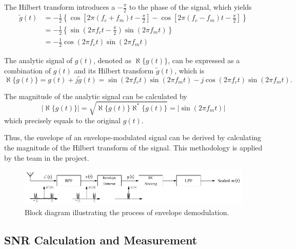 \documentclass[../ECE459FinalProjectReport.tex]{subfiles}
\begin{document}
The Hilbert transform introduces a $-\frac{\pi}{2}$ to the phase of the signal, which yields
\begin{equation}
    \begin{aligned}
        \tilde{g}(t)&=-\frac{1}{2}\left\lbrace\cos\left[2\pi (f_c+f_m)t - \frac{\pi}{2}\right]-\cos\left[2\pi (f_c-f_m)t - \frac{\pi}{2}\right]\right\rbrace\\
        &=-\frac{1}{2}\left\{ \sin \left( 2\pi f_ct-\frac{\pi}{2} \right) \sin \left( 2\pi f_mt \right) \right\} \\
                    &=-\frac{1}{2}\cos \left( 2\pi f_ct \right) \sin \left( 2\pi f_mt \right) 
    \end{aligned}
\end{equation}

The analytic signal of $g(t)$, denoted as $\aleph\{g(t)\}$, can be expressed as a combination of $g(t)$ and its Hilbert transform $\tilde{g}(t)$, which is
\begin{equation}
    \aleph\{g(t)\} = g(t) + j\tilde{g}(t) = \sin(2\pi f_c t)\sin(2\pi f_m t) - j\cos(2\pi f_c t)\sin(2\pi f_m t).
\end{equation}

The magnitude of the analytic signal can be calculated by
\begin{equation}
    \left| \aleph\{g(t)\}\right| = \sqrt{\aleph\{g(t)\}\aleph^*\{g(t)\}} = \left| \sin(2\pi f_m t)\right|
\end{equation}
which precisely equals to the original $g(t)$.

Thus, the envelope of an envelope-modulated signal can be derived by calculating the magnitude of the Hilbert transform of the signal. This methodology is applied by the team in the project.

\begin{figure}[htb]
    \centering
    \includegraphics[width=\linewidth]{plots/env-demod.pdf}
    \caption{Block diagram illustrating the process of envelope demodulation.}
    \label{fig:env-demod}
\end{figure}

\subsection{SNR Calculation and Measurement}
\end{document}
